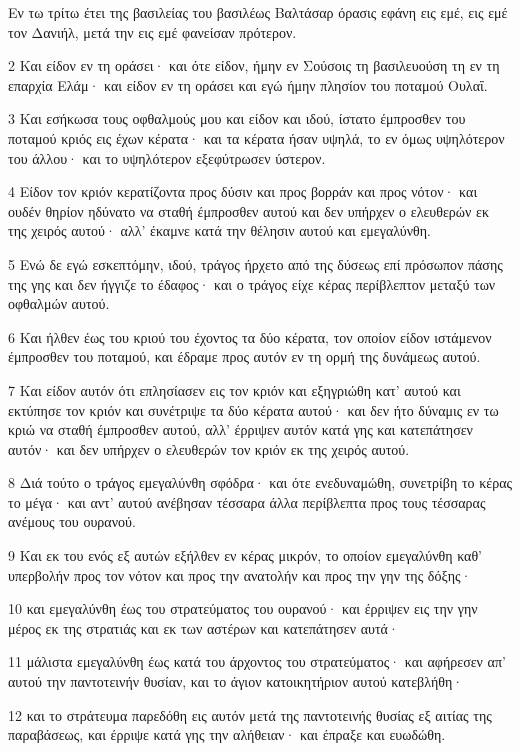 \par Εν τω τρίτω έτει της βασιλείας του βασιλέως Βαλτάσαρ όρασις εφάνη εις εμέ, εις εμέ τον Δανιήλ, μετά την εις εμέ φανείσαν πρότερον.
\par 2 Και είδον εν τη οράσει· και ότε είδον, ήμην εν Σούσοις τη βασιλευούση τη εν τη επαρχία Ελάμ· και είδον εν τη οράσει και εγώ ήμην πλησίον του ποταμού Ουλαΐ.
\par 3 Και εσήκωσα τους οφθαλμούς μου και είδον και ιδού, ίστατο έμπροσθεν του ποταμού κριός εις έχων κέρατα· και τα κέρατα ήσαν υψηλά, το εν όμως υψηλότερον του άλλου· και το υψηλότερον εξεφύτρωσεν ύστερον.
\par 4 Είδον τον κριόν κερατίζοντα προς δύσιν και προς βορράν και προς νότον· και ουδέν θηρίον ηδύνατο να σταθή έμπροσθεν αυτού και δεν υπήρχεν ο ελευθερών εκ της χειρός αυτού· αλλ' έκαμνε κατά την θέλησιν αυτού και εμεγαλύνθη.
\par 5 Ενώ δε εγώ εσκεπτόμην, ιδού, τράγος ήρχετο από της δύσεως επί πρόσωπον πάσης της γης και δεν ήγγιζε το έδαφος· και ο τράγος είχε κέρας περίβλεπτον μεταξύ των οφθαλμών αυτού.
\par 6 Και ήλθεν έως του κριού του έχοντος τα δύο κέρατα, τον οποίον είδον ιστάμενον έμπροσθεν του ποταμού, και έδραμε προς αυτόν εν τη ορμή της δυνάμεως αυτού.
\par 7 Και είδον αυτόν ότι επλησίασεν εις τον κριόν και εξηγριώθη κατ' αυτού και εκτύπησε τον κριόν και συνέτριψε τα δύο κέρατα αυτού· και δεν ήτο δύναμις εν τω κριώ να σταθή έμπροσθεν αυτού, αλλ' έρριψεν αυτόν κατά γης και κατεπάτησεν αυτόν· και δεν υπήρχεν ο ελευθερών τον κριόν εκ της χειρός αυτού.
\par 8 Διά τούτο ο τράγος εμεγαλύνθη σφόδρα· και ότε ενεδυναμώθη, συνετρίβη το κέρας το μέγα· και αντ' αυτού ανέβησαν τέσσαρα άλλα περίβλεπτα προς τους τέσσαρας ανέμους του ουρανού.
\par 9 Και εκ του ενός εξ αυτών εξήλθεν εν κέρας μικρόν, το οποίον εμεγαλύνθη καθ' υπερβολήν προς τον νότον και προς την ανατολήν και προς την γην της δόξης·
\par 10 και εμεγαλύνθη έως του στρατεύματος του ουρανού· και έρριψεν εις την γην μέρος εκ της στρατιάς και εκ των αστέρων και κατεπάτησεν αυτά·
\par 11 μάλιστα εμεγαλύνθη έως κατά του άρχοντος του στρατεύματος· και αφήρεσεν απ' αυτού την παντοτεινήν θυσίαν, και το άγιον κατοικητήριον αυτού κατεβλήθη·
\par 12 και το στράτευμα παρεδόθη εις αυτόν μετά της παντοτεινής θυσίας εξ αιτίας της παραβάσεως, και έρριψε κατά γης την αλήθειαν· και έπραξε και ευωδώθη.
